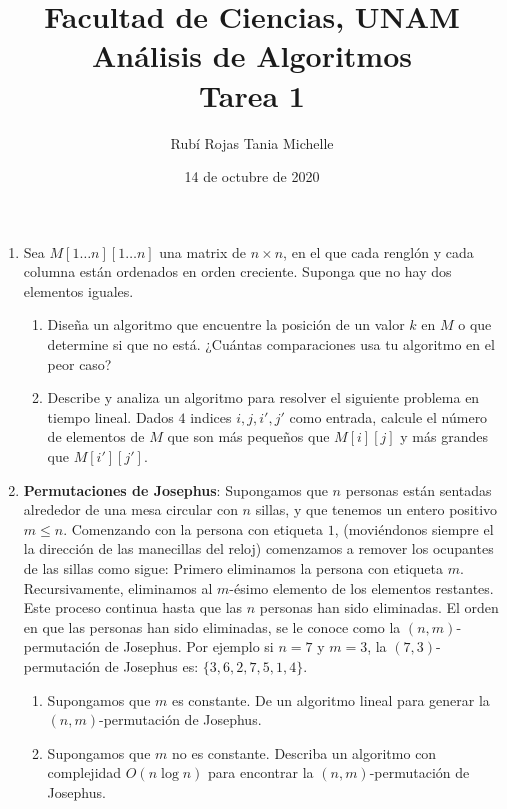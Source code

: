 \documentclass[letterpaper,11pt]{article}
\title{Facultad de Ciencias, UNAM \\ 
       Análisis de Algoritmos \\ 
       Tarea 1}
\author{Rubí Rojas Tania Michelle}
\date{14 de octubre de 2020}
\begin{document}
\maketitle

\begin{enumerate}
    \item Sea $M [1 \dots n][1 \dots n]$ una matrix de $n \times n$, en el que 
    cada renglón y cada columna están ordenados en orden creciente. Suponga que 
    no hay dos elementos iguales.
    
    \begin{enumerate}
        \item Diseña un algoritmo que encuentre la posición de un valor $k$ en 
        $M$ o que determine si que no está. ¿Cuántas comparaciones usa tu 
        algoritmo en el peor caso?

        \item Describe y analiza un algoritmo para resolver el siguiente 
        problema en tiempo lineal. Dados $4$ indices  $i, j, i', j'$ como 
        entrada, calcule el número de elementos de $M$ que son más pequeños que 
        $M[i][j]$ y más grandes que $M[i'][j']$.
    \end{enumerate}
    
    \item {\bf Permutaciones de Josephus}: Supongamos que $n$ personas están 
    sentadas alrededor de una mesa circular con $n$ sillas, y que tenemos un
    entero positivo $m \leq n$. Comenzando con la persona con etiqueta $1$,
    (moviéndonos siempre el la dirección de las manecillas del reloj) comenzamos
    a remover los ocupantes de las sillas como sigue: Primero eliminamos la 
    persona con etiqueta $m$. Recursivamente, eliminamos al $m$-ésimo elemento 
    de los elementos restantes. Este proceso continua hasta que las $n$ personas 
    han sido eliminadas. El orden en que las personas han sido eliminadas, se 
    le conoce como la $(n, m)$-permutación de Josephus. Por ejemplo si $n=7$ y 
    $m=3$, la $(7,3)$-permutaci\'on de Josephus es: $\{3,6,2,7,5,1,4\}$.
         
    \begin{enumerate}
        \item Supongamos que $m$ es constante. De un algoritmo lineal para generar
        la $(n,m)$-permutación de Josephus.

        \item Supongamos que $m$ no es constante. Describa un algoritmo con
        complejidad $O(n \log n)$ para encontrar la $(n,m)$-permutación de Josephus.
    \end{enumerate}
         

\end{enumerate}
\end{document}
